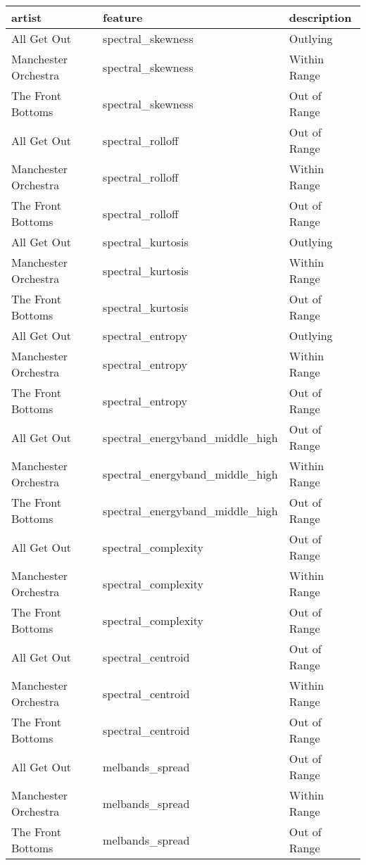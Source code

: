 \documentclass{article}\usepackage[]{graphicx}\usepackage[]{xcolor}
\begin{document}
\begin{table}[ht]
\centering
\begin{tabular}{lll}
  \hline
  artist & feature & description \\ 
  \hline
  All Get Out & spectral\_skewness & Outlying \\ 
  Manchester Orchestra & spectral\_skewness & Within Range \\ 
  The Front Bottoms & spectral\_skewness & Out of Range \\ 
  All Get Out & spectral\_rolloff & Out of Range \\ 
  Manchester Orchestra & spectral\_rolloff & Within Range \\ 
  The Front Bottoms & spectral\_rolloff & Out of Range \\ 
  All Get Out & spectral\_kurtosis & Outlying \\ 
  Manchester Orchestra & spectral\_kurtosis & Within Range \\ 
  The Front Bottoms & spectral\_kurtosis & Out of Range \\ 
  All Get Out & spectral\_entropy & Outlying \\ 
  Manchester Orchestra & spectral\_entropy & Within Range \\ 
  The Front Bottoms & spectral\_entropy & Out of Range \\ 
  All Get Out & spectral\_energyband\_middle\_high & Out of Range \\ 
  Manchester Orchestra & spectral\_energyband\_middle\_high & Within Range \\ 
  The Front Bottoms & spectral\_energyband\_middle\_high & Out of Range \\ 
  All Get Out & spectral\_complexity & Out of Range \\ 
  Manchester Orchestra & spectral\_complexity & Within Range \\ 
  The Front Bottoms & spectral\_complexity & Out of Range \\ 
  All Get Out & spectral\_centroid & Out of Range \\ 
  Manchester Orchestra & spectral\_centroid & Within Range \\ 
  The Front Bottoms & spectral\_centroid & Out of Range \\ 
  All Get Out & melbands\_spread & Out of Range \\ 
  Manchester Orchestra & melbands\_spread & Within Range \\ 
  The Front Bottoms & melbands\_spread & Out of Range \\ 

\end{tabular}
\end{table}
\end{document}
